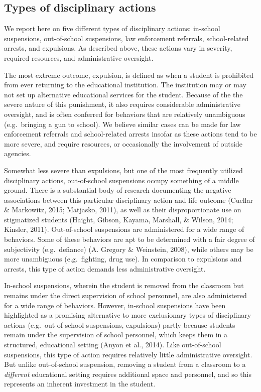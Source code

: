 \documentclass[english,floatsintext,man]{apa6}
\theoremstyle{definition}
\theoremstyle{definition}
\theoremstyle{remark}
\begin{document}
\subsection{Types of disciplinary
actions}\label{types-of-disciplinary-actions}

We report here on five different types of disciplinary actions:
in-school suspensions, out-of-school suspensions, law enforcement
referrals, school-related arrests, and expulsions. As described above,
these actions vary in severity, required resources, and administrative
oversight.

The most extreme outcome, expulsion, is defined as when a student is
prohibited from ever returning to the educational institution. The
institution may or may not set up alternative educational services for
the student. Because of the the severe nature of this punishment, it
also requires considerable administrative oversight, and is often
conferred for behaviors that are relatively unambiguous (e.g.~bringing a
gun to school). We believe similar cases can be made for law enforcement
referrals and school-related arrests insofar as these actions tend to be
more severe, and require resources, or occasionally the involvement of
outside agencies.

Somewhat less severe than expulsions, but one of the most frequently
utilized disciplinary actions, out-of-school suspensions occupy
something of a middle ground. There is a substantial body of research
documenting the negative associations between this particular
disciplinary action and life outcome (Cuellar \& Markowitz, 2015;
Matjasko, 2011), as well as their disproportionate use on stigmatized
students (Haight, Gibson, Kayama, Marshall, \& Wilson, 2014; Kinsler,
2011). Out-of-school suspensions are administered for a wide range of
behaviors. Some of these behaviors are apt to be determined with a fair
degree of subjectivity (e.g.~defiance) (A. Gregory \& Weinstein, 2008),
while others may be more unambiguous (e.g.~fighting, drug use). In
comparison to expulsions and arrests, this type of action demands less
administrative oversight.

In-school suspensions, wherein the student is removed from the classroom
but remains under the direct supervision of school personnel, are also
administered for a wide range of behaviors. However, in-school
suspensions have been highlighted as a promising alternative to more
exclusionary types of disciplinary actions (e.g.~out-of-school
suspensions, expulsions) partly because students remain under the
supervision of school personnel, which keeps them in a structured,
educational setting (Anyon et al., 2014). Like out-of-school
suspensions, this type of action requires relatively little
administrative oversight. But unlike out-of-school suspension, removing
a student from a classroom to a \emph{different} educational setting
requires additional space and personnel, and so this represents an
inherent investment in the student.
\end{document}
